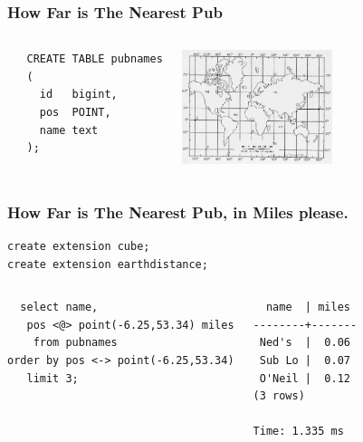 \documentclass{beamer}
\begin{document}
\begin{frame}[fragile]
  \frametitle{How Far is The Nearest Pub}

  \vfill

\begin{columns}[c]

\begin{verbatim}
   CREATE TABLE pubnames
   (
     id   bigint,
     pos  POINT,
     name text
   );
\end{verbatim}  

\begin{center}
  \includegraphics[height=9em]{ltlng.jpg}
\end{center}
\end{columns}
\end{frame}

\begin{frame}[fragile]
  \frametitle{How Far is The Nearest Pub, in Miles please.}

\begin{verbatim}
create extension cube;
create extension earthdistance;
\end{verbatim}  
\vfill

\begin{columns}
\begin{verbatim}
  select name,
   pos <@> point(-6.25,53.34) miles
    from pubnames
order by pos <-> point(-6.25,53.34)
   limit 3;
\end{verbatim}  
\begin{verbatim}
  name  | miles 
--------+-------
 Ned's  |  0.06
 Sub Lo |  0.07
 O'Neil |  0.12
(3 rows)

Time: 1.335 ms
\end{verbatim}  
\end{columns}
\end{frame}
\end{document}

